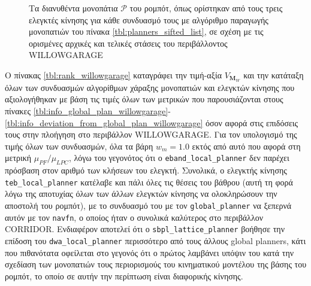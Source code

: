 \begin{figure}
\raggedright
  \begin{subfigure}[t]{\linewidth}
    \centering
    
  \end{subfigure}%
  \vspace{-1.5cm}
  \begin{subfigure}[t]{\linewidth}
    \centering
    
  \end{subfigure}%
  \vspace{-1.5cm}
  \begin{subfigure}[t]{\linewidth}
    \centering
    
  \end{subfigure}%
  \caption{\small Τα διανυθέντα μονοπάτια $\bm{\mathcal{P}}$ του ρομπότ, όπως
           ορίστηκαν από τους τρεις ελεγκτές κίνησης για κάθε συνδυασμό τους με
           αλγόριθμο παραγωγής μονοπατιών του πίνακα
           \ref{tbl:planners_sifted_list}, σε σχέση με τις ορισμένες αρχικές και
           τελικές στάσεις του περιβάλλοντος WILLOWGARAGE}
  \label{fig:ground_truths:willowgarage}
\end{figure}

Ο πίνακας \ref{tbl:rank_willowgarage} καταγράφει την τιμή-αξία $V_{\bm{M}_W}$
και την κατάταξη όλων των συνδυασμών αλγορίθμων χάραξης μονοπατιών και
ελεγκτών κίνησης που αξιολογήθηκαν με βάση τις τιμές όλων των μετρικών που
παρουσιάζονται στους πίνακες \ref{tbl:info_global_plan_willowgarage}-
\ref{tbl:info_deviation_from_global_plan_willowgarage} όσον αφορά στις
επιδόσεις τους στην πλοήγηση στο περιβάλλον WILLOWGARAGE. Για τον υπολογισμό
της τιμής όλων των συνδυασμών, όλα τα βάρη $w_m = 1.0$ εκτός από αυτό που αφορά
στη μετρική $\mu_{PF} / \mu_{LPC}$, λόγω του γεγονότος ότι ο
\texttt{eband\_local\_planner} δεν παρέχει πρόσβαση στον αριθμό των κλήσεων του
ελεγκτή. Συνολικά, ο ελεγκτής κίνησης \texttt{teb\_local\_planner} κατέλαβε και
πάλι όλες τις θέσεις του βάθρου (αυτή τη φορά λόγω της αποτυχίας όλων των άλλων
ελεγκτών κίνησης να ολοκληρώσουν την αποστολή του ρομπότ), με το συνδυασμό του
με τον \texttt{global\_planner} να ξεπερνά αυτόν με τον \texttt{navfn}, ο
οποίος ήταν ο συνολικά καλύτερος στο περιβάλλον CORRIDOR. Ενδιαφέρον αποτελεί
ότι ο \texttt{sbpl\_lattice\_planner} βοήθησε την επίδοση του
\texttt{dwa\_local\_planner} περισσότερο από τους άλλους global planners,
κάτι που πιθανότατα οφείλεται στο γεγονός ότι ο πρώτος λαμβάνει υπόψιν του
κατά την σχεδίαση των μονοπατιών τους περιορισμούς του κινηματικού μοντέλου
της βάσης του ρομπότ, το οποίο σε αυτήν την περίπτωση είναι διαφορικής κίνησης.



